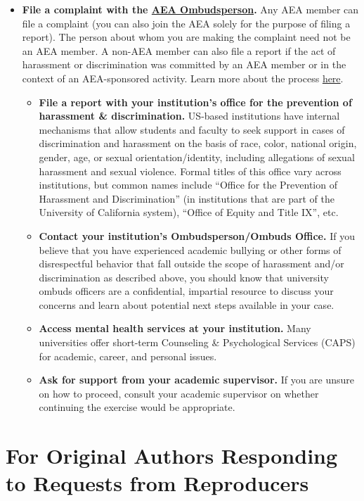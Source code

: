 \documentclass[]{book}
\providecommand{\tightlist}{%
  \setlength{\itemsep}{0pt}\setlength{\parskip}{0pt}}
\begin{document}
\begin{itemize}
\tightlist
\item
  \textbf{File a complaint with the \href{https://www.aeaweb.org/about-aea/aea-ombudsperson}{AEA Ombudsperson}.} Any AEA member can file a complaint (you can also join the AEA solely for the purpose of filing a report). The person about whom you are making the complaint need not be an AEA member. A non-AEA member can also file a report if the act of harassment or discrimination was committed by an AEA member or in the context of an AEA-sponsored activity. Learn more about the process \href{https://www.aeaweb.org/about-aea/aea-ombudsperson/faq}{here}.

  \begin{itemize}
  \tightlist
  \item
    \textbf{File a report with your institution's office for the prevention of harassment \& discrimination.} US-based institutions have internal mechanisms that allow students and faculty to seek support in cases of discrimination and harassment on the basis of race, color, national origin, gender, age, or sexual orientation/identity, including allegations of sexual harassment and sexual violence. Formal titles of this office vary across institutions, but common names include ``Office for the Prevention of Harassment and Discrimination'' (in institutions that are part of the University of California system), ``Office of Equity and Title IX'', etc.
  \item
    \textbf{Contact your institution's Ombudsperson/Ombuds Office.} If you believe that you have experienced academic bullying or other forms of disrespectful behavior that fall outside the scope of harassment and/or discrimination as described above, you should know that university ombuds officers are a confidential, impartial resource to discuss your concerns and learn about potential next steps available in your case.
  \item
    \textbf{Access mental health services at your institution.} Many universities offer short-term Counseling \& Psychological Services (CAPS) for academic, career, and personal issues.
  \item
    \textbf{Ask for support from your academic supervisor.} If you are unsure on how to proceed, consult your academic supervisor on whether continuing the exercise would be appropriate.
  \end{itemize}
\end{itemize}

\hypertarget{for-original-authors-responding-to-requests-from-reproducers}{%
\section{For Original Authors Responding to Requests from Reproducers}\label{for-original-authors-responding-to-requests-from-reproducers}}
\end{document}
